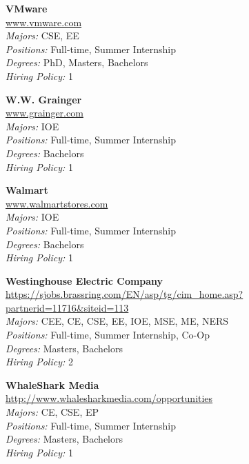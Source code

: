 \documentclass[twoside]{article}
\begin{document}
\begin{center}
\begin{multicols}{3}
\begin{minipage}{.9\columnwidth}{\Large\bf VMware }\\
	\url{www.vmware.com}\\
	\emph{Majors:} CSE, EE\\
	\emph{Positions:} Full-time, Summer Internship\\
	\emph{Degrees:} PhD, Masters, Bachelors\\
	\emph{Hiring Policy:} 1\\
\end{minipage}
 
\begin{minipage}{.9\columnwidth}{\Large\bf W.W. Grainger }\\
	\url{www.grainger.com}\\
	\emph{Majors:} IOE\\
	\emph{Positions:} Full-time, Summer Internship\\
	\emph{Degrees:} Bachelors\\
	\emph{Hiring Policy:} 1\\
\end{minipage}
 
\begin{minipage}{.9\columnwidth}{\Large\bf Walmart }\\
	\url{www.walmartstores.com}\\
	\emph{Majors:} IOE\\
	\emph{Positions:} Full-time, Summer Internship\\
	\emph{Degrees:} Bachelors\\
	\emph{Hiring Policy:} 1\\
\end{minipage}
 
\begin{minipage}{.9\columnwidth}{\Large\bf Westinghouse Electric Company }\\
	\url{https://sjobs.brassring.com/EN/asp/tg/cim_home.asp?partnerid=11716&siteid=113}\\
	\emph{Majors:} CEE, CE, CSE, EE, IOE, MSE, ME, NERS\\
	\emph{Positions:} Full-time, Summer Internship, Co-Op\\
	\emph{Degrees:} Masters, Bachelors\\
	\emph{Hiring Policy:} 2\\
\end{minipage}
 
\begin{minipage}{.9\columnwidth}{\Large\bf WhaleShark Media }\\
	\url{http://www.whalesharkmedia.com/opportunities}\\
	\emph{Majors:} CE, CSE, EP\\
	\emph{Positions:} Full-time, Summer Internship\\
	\emph{Degrees:} Masters, Bachelors\\
	\emph{Hiring Policy:} 1\\
\end{minipage}
 

\end{multicols}
\end{center}
\end{document}
